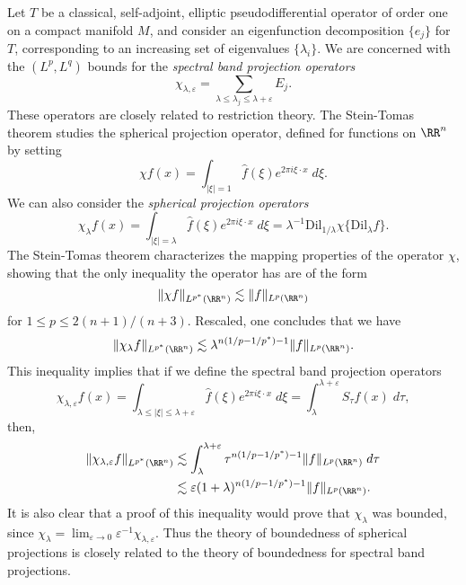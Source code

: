 Let $T$ be a classical, self-adjoint, elliptic pseudodifferential operator of order one on a compact manifold $M$, and consider an eigenfunction decomposition $\{ e_j \}$ for $T$, corresponding to an increasing set of eigenvalues $\{ \lambda_i \}$. We are concerned with the $(L^p,L^q)$ bounds for the \emph{spectral band projection operators}
%
\[ \chi_{\lambda,\varepsilon} = \sum_{\lambda \leq \lambda_j \leq \lambda + \varepsilon} E_j. \]
%
These operators are closely related to restriction theory. The Stein-Tomas theorem studies the spherical projection operator, defined for functions on $\RR^n$ by setting
%
\[ \chi f(x) = \int_{|\xi| = 1} \widehat{f}(\xi) e^{2 \pi i \xi \cdot x}\; d\xi. \]
%
We can also consider the \emph{spherical projection operators}
%
\[ \chi_\lambda f(x) = \int_{|\xi| = \lambda} \widehat{f}(\xi) e^{2 \pi i \xi \cdot x}\; d\xi = \lambda^{-1} \text{Dil}_{1/\lambda} \chi \{ \text{Dil}_\lambda f \}. \]
%
The Stein-Tomas theorem characterizes the mapping properties of the operator $\chi$, showing that the only inequality the operator has are of the form
%
\[ \| \chi f \|_{L^{p^*}(\RR^n)} \lesssim \| f \|_{L^p(\RR^n)} \]
%
for $1 \leq p \leq 2(n+1)/(n+3)$. Rescaled, one concludes that we have
%
\[ \| \chi_\lambda f \|_{L^{p^*}(\RR^n)} \lesssim \lambda^{n(1/p - 1/p^*)-1} \| f \|_{L^p(\RR^n)}. \]
%
This inequality implies that if we define the spectral band projection operators
%
\[ \chi_{\lambda,\varepsilon} f(x) = \int_{\lambda \leq |\xi| \leq \lambda + \varepsilon} \widehat{f}(\xi) e^{2 \pi i \xi \cdot x}\; d\xi = \int_\lambda^{\lambda + \varepsilon} S_\tau f(x)\; d\tau, \]
%
then,
%
\begin{align*}
    \| \chi_{\lambda,\varepsilon} f \|_{L^{p^*}(\RR^n)} &\lesssim \int_\lambda^{\lambda + \varepsilon} \tau^{n(1/p - 1/p^*) - 1} \| f \|_{L^p(\RR^n)}\; d\tau\\
    &\lesssim \varepsilon (1 + \lambda)^{n(1/p - 1/p^*) - 1} \| f \|_{L^p(\RR^n)}.
\end{align*}
%
It is also clear that a proof of this inequality would prove that $\chi_\lambda$ was bounded, since $\chi_\lambda = \lim_{\varepsilon \to 0} \varepsilon^{-1} \chi_{\lambda, \varepsilon}$. Thus the theory of boundedness of spherical projections is closely related to the theory of boundedness for spectral band projections.

